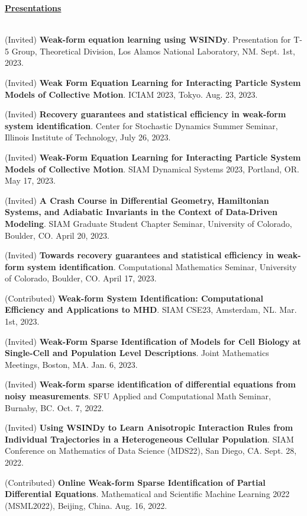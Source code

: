 \documentclass[letterpaper,11pt,oneside]{article}
\newcommand{\headr}[1]{\vspace{10pt}\uline{\Large{\textbf{#1}} \hfill } \\ \vspace{-10pt}\\}
\begin{document}
\headr{Presentations}
\vspace{-0.5cm}
\begin{enumerate}[label={[\arabic*]}]
\item (Invited) \textbf{Weak-form equation learning using WSINDy}. Presentation for T-5 Group, Theoretical Division, Los Alamos National Laboratory, NM. Sept. 1st, 2023.
\item (Invited) \textbf{Weak Form Equation Learning for Interacting Particle System
Models of Collective Motion}. ICIAM 2023, Tokyo. Aug. 23, 2023.
\item (Invited) \textbf{Recovery guarantees and statistical efficiency in weak-form
system identification}. Center for Stochastic Dynamics Summer Seminar, Illinois Institute of Technology, July 26, 2023.
\item (Invited) \textbf{Weak-Form Equation Learning for Interacting Particle System Models of Collective Motion}. SIAM Dynamical Systems 2023, Portland, OR. May 17, 2023.
\item (Invited) \textbf{A Crash Course in Differential Geometry, Hamiltonian Systems, and Adiabatic Invariants in the Context of Data-Driven Modeling}. SIAM Graduate Student Chapter Seminar, University of Colorado, Boulder, CO. April 20, 2023.
\item (Invited) \textbf{Towards recovery guarantees and statistical efficiency in weak-form system identification}. Computational Mathematics Seminar, University of Colorado, Boulder, CO. April 17, 2023.
\item (Contributed) \textbf{Weak-form System Identification: Computational Efficiency and Applications to MHD}. SIAM CSE23, Amsterdam, NL. Mar. 1st, 2023.
\item (Invited) \textbf{Weak-Form Sparse Identification of Models for Cell Biology at Single-Cell and Population Level Descriptions}. Joint Mathematics Meetings, Boston, MA. Jan. 6, 2023.
\item (Invited) \textbf{Weak-form sparse identification of differential equations from noisy measurements}. SFU Applied and Computational Math Seminar, Burnaby, BC. Oct. 7, 2022.
\item (Invited) \textbf{Using WSINDy to Learn Anisotropic Interaction 
Rules from Individual Trajectories in a Heterogeneous Cellular Population}. SIAM Conference on Mathematics of Data Science (MDS22), San Diego, CA. Sept. 28, 2022.
\item (Contributed) \textbf{Online Weak-form Sparse Identification of Partial Differential Equations}. Mathematical and Scientific Machine Learning 2022 (MSML2022), Beijing, China. Aug. 16, 2022.

\end{enumerate}
\end{document}
